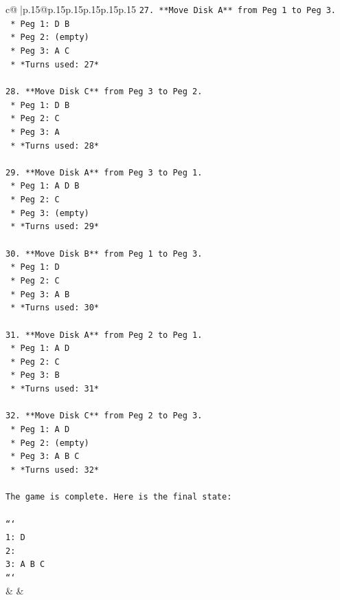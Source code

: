 \documentclass{article}
\begin{document}
{\begin{supertabular}{c@{$\;$}|p{.15\linewidth}@{}p{.15\linewidth}p{.15\linewidth}p{.15\linewidth}p{.15\linewidth}p{.15\linewidth}}
{{{\texttt{27. **Move Disk A** from Peg 1 to Peg 3.} \\
\texttt{    *   Peg 1: D B} \\
\texttt{    *   Peg 2: (empty)} \\
\texttt{    *   Peg 3: A C} \\
\texttt{    *   *Turns used: 27*} \\
\\ 
\texttt{28. **Move Disk C** from Peg 3 to Peg 2.} \\
\texttt{    *   Peg 1: D B} \\
\texttt{    *   Peg 2: C} \\
\texttt{    *   Peg 3: A} \\
\texttt{    *   *Turns used: 28*} \\
\\ 
\texttt{29. **Move Disk A** from Peg 3 to Peg 1.} \\
\texttt{    *   Peg 1: A D B} \\
\texttt{    *   Peg 2: C} \\
\texttt{    *   Peg 3: (empty)} \\
\texttt{    *   *Turns used: 29*} \\
\\ 
\texttt{30. **Move Disk B** from Peg 1 to Peg 3.} \\
\texttt{    *   Peg 1: D} \\
\texttt{    *   Peg 2: C} \\
\texttt{    *   Peg 3: A B} \\
\texttt{    *   *Turns used: 30*} \\
\\ 
\texttt{31. **Move Disk A** from Peg 2 to Peg 1.} \\
\texttt{    *   Peg 1: A D} \\
\texttt{    *   Peg 2: C} \\
\texttt{    *   Peg 3: B} \\
\texttt{    *   *Turns used: 31*} \\
\\ 
\texttt{32. **Move Disk C** from Peg 2 to Peg 3.} \\
\texttt{    *   Peg 1: A D} \\
\texttt{    *   Peg 2: (empty)} \\
\texttt{    *   Peg 3: A B C} \\
\texttt{    *   *Turns used: 32*} \\
\\ 
\texttt{The game is complete. Here is the final state:} \\
\\ 
\texttt{```} \\
\texttt{1: D} \\
\texttt{2: } \\
\texttt{3: A B C} \\
\texttt{```} \\
            }
        }
    }
    & & \\ \\


\end{supertabular}}
\end{document}
